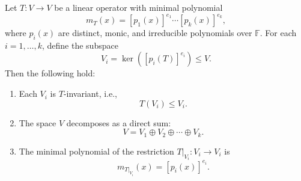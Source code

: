 \begin{theorem}\label{thm:primary-decomposition}
Let \( T : V \rightarrow V \) be a linear operator with minimal polynomial
\[
m_T(x) = \left[ p_1(x) \right]^{e_1} \cdots \left[ p_k(x) \right]^{e_k},
\]
where \( p_i(x) \) are distinct, monic, and irreducible polynomials over \( \mathbb{F} \). For each \( i = 1, \ldots, k \), define the subspace
\[
V_i = \ker\left( \left[ p_i(T) \right]^{e_i} \right) \leq V.
\]
Then the following hold:
\begin{enumerate}
    \item Each \( V_i \) is \( T \)-invariant, i.e.,
    \[
    T(V_i) \leq V_i.
    \]
    
    \item The space \( V \) decomposes as a direct sum:
    \[
    V = V_1 \oplus V_2 \oplus \cdots \oplus V_k.
    \]
    
    \item The minimal polynomial of the restriction \( T|_{V_i} : V_i \to V_i \) is
    \[
    m_{T|_{V_i}}(x) = \left[ p_i(x) \right]^{e_i}.
    \]
\end{enumerate}
\end{theorem}

